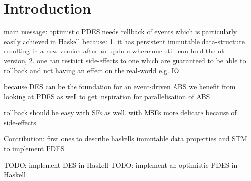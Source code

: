 \section{Introduction}
main message: optimistic PDES needs rollback of events which is particularly easily achieved in Haskell because: 1. it has persistent immutable data-structure resulting in a new version after an update where one still can hold the old version, 2. one can restrict side-effects to one which are guaranteed to be able to rollback and not having an effect on the real-world e.g. IO

because DES can be the foundation for an event-driven ABS we benefit from looking at PDES as well to get inspiration for parallelisation of ABS

rollback should be easy with SFs as well. with MSFs more delicate because of side-effects

Contribution: first ones to describe haskells immutable data properties and STM to implement PDES

TODO: implement DES in Haskell
TODO: implement an optimistic PDES in Haskell